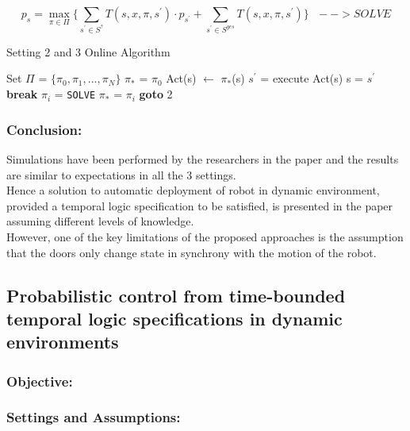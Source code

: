 \documentclass{article}
\theoremstyle{definition}
\begin{document}
\begin{enumerate}
\begin{itemize}
        \[ p_s = \max_{\pi\in\Pi} \{ \sum_{s^{'}\in S^{?}} T(s,x,\pi,s^{'})\cdot p_{s^{'}}  + \sum_{s^{'}\in S^{yes}} T(s,x,\pi,s^{'})  \} \ \ \ --> SOLVE  \]
        \begin{algorithm}
        \caption{Setting 2 and 3 Online Algorithm \cite{sahil1}}\label{euclid}
        \begin{algorithmic}[1]
        \REQUIRE Set $\Pi$ = $\{ \pi_0,\pi_1,...,\pi_N \}$
        \STATE $\pi_*$ = $\pi_0$
        \STATE Act(s) $\leftarrow$ $\pi_*$(s)
        \STATE $s^{'}$ = execute Act(s)
        \STATE s = $s^{'}$
        \STATE \textbf{break}
        \ELSE
        \STATE $\pi_i$ = \texttt{SOLVE}
        \STATE $\pi_*$ = $\pi_i$
        \ENDIF
        \STATE \textbf{goto} 2
        \ENDIF
        \ENDWHILE
        \end{algorithmic}
        \end{algorithm}
    \end{itemize}
\end{enumerate}


\subsubsection{Conclusion:}
Simulations have been performed by the researchers in the paper \cite{sahil1} and the results are similar to expectations in all the 3 settings.\\
Hence a solution to automatic deployment of robot in dynamic environment, provided a temporal logic specification to be satisfied, is presented in the paper assuming different levels of knowledge.\\
However, one of the key limitations of the proposed approaches is the assumption that the doors only change state in synchrony with the motion of the robot.

\subsection{Probabilistic control from time-bounded temporal logic specifications in dynamic environments}
\subsubsection{Objective:}

\subsubsection{Settings and Assumptions:}
\end{document}
